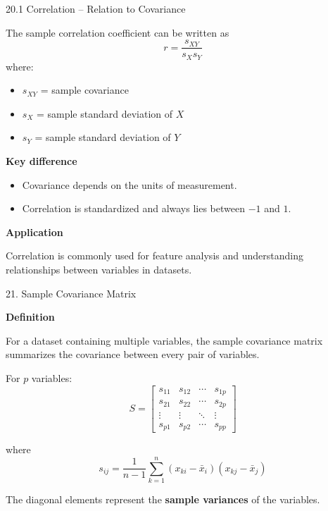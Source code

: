 
\begin{frame}{20.1 Correlation -- Relation to Covariance}

The sample correlation coefficient can be written as
\[
\boxed{
r
=
\frac{s_{XY}}{s_Xs_Y}
}
\]
where:

\begin{itemize}
    \item $s_{XY}$ = sample covariance
    \item $s_X$ = sample standard deviation of $X$
    \item $s_Y$ = sample standard deviation of $Y$
\end{itemize}

\vspace{0.2cm}

\textbf{Key difference}

\begin{itemize}
    \item Covariance depends on the units of measurement.
    \item Correlation is standardized and always lies between $-1$ and $1$.
\end{itemize}

\vspace{0.1cm}

\textbf{Application}

Correlation is commonly used for feature analysis and
understanding relationships between variables in datasets.

\end{frame}



\begin{frame}{21. Sample Covariance Matrix}

\textbf{Definition}

For a dataset containing multiple variables, the sample
covariance matrix summarizes the covariance between every
pair of variables.

For $p$ variables:
\[
\boxed{
S=
\begin{bmatrix}
s_{11} & s_{12} & \cdots & s_{1p}\\
s_{21} & s_{22} & \cdots & s_{2p}\\
\vdots & \vdots & \ddots & \vdots\\
s_{p1} & s_{p2} & \cdots & s_{pp}
\end{bmatrix}
}
\]

where
\[
s_{ij}
=
\frac{1}{n-1}
\sum_{k=1}^{n}
(x_{ki}-\bar{x}_i)(x_{kj}-\bar{x}_j)
\]

The diagonal elements represent the \textbf{sample variances}
of the variables.

\end{frame}


